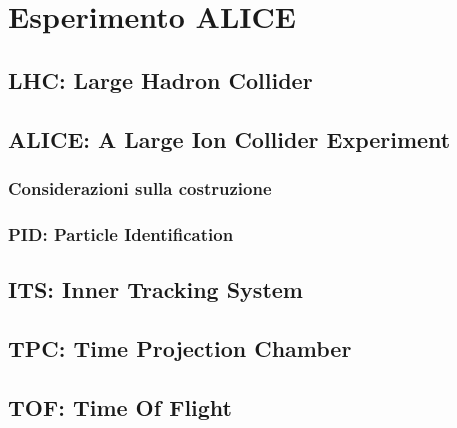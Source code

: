 \chapter{Esperimento ALICE}

\section{LHC: Large Hadron Collider}

\section{ALICE: A Large Ion Collider Experiment}

    \subsection{Considerazioni sulla costruzione}

    \subsection{PID: Particle Identification}

\section{ITS: Inner Tracking System}

\section{TPC: Time Projection Chamber}

\section{TOF: Time Of Flight}